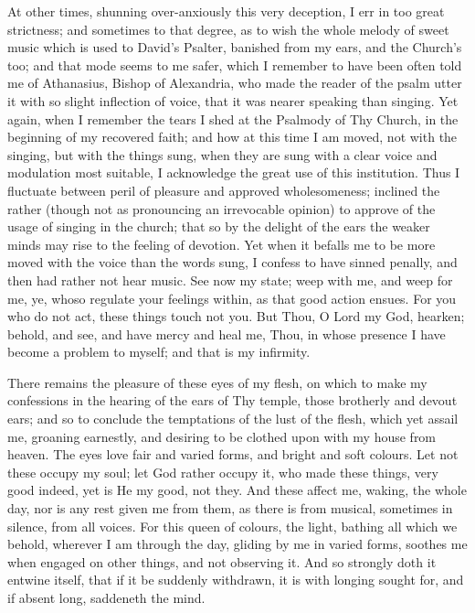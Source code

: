 \documentclass[b5paper,openright,12pt,twoside]{book}
\begin{document}
At other times, shunning over-anxiously this very deception, I err in
too great strictness; and sometimes to that degree, as to wish the whole
melody of sweet music which is used to David's Psalter, banished from
my ears, and the Church's too; and that mode seems to me safer, which I
remember to have been often told me of Athanasius, Bishop of Alexandria,
who made the reader of the psalm utter it with so slight inflection
of voice, that it was nearer speaking than singing. Yet again, when
I remember the tears I shed at the Psalmody of Thy Church, in the
beginning of my recovered faith; and how at this time I am moved, not
with the singing, but with the things sung, when they are sung with a
clear voice and modulation most suitable, I acknowledge the great use
of this institution. Thus I fluctuate between peril of pleasure and
approved wholesomeness; inclined the rather (though not as pronouncing
an irrevocable opinion) to approve of the usage of singing in the
church; that so by the delight of the ears the weaker minds may rise to
the feeling of devotion. Yet when it befalls me to be more moved with
the voice than the words sung, I confess to have sinned penally, and
then had rather not hear music. See now my state; weep with me, and weep
for me, ye, whoso regulate your feelings within, as that good action
ensues. For you who do not act, these things touch not you. But Thou, O
Lord my God, hearken; behold, and see, and have mercy and heal me, Thou,
in whose presence I have become a problem to myself; and that is my
infirmity.

There remains the pleasure of these eyes of my flesh, on which to make
my confessions in the hearing of the ears of Thy temple, those brotherly
and devout ears; and so to conclude the temptations of the lust of
the flesh, which yet assail me, groaning earnestly, and desiring to be
clothed upon with my house from heaven. The eyes love fair and varied
forms, and bright and soft colours. Let not these occupy my soul; let
God rather occupy it, who made these things, very good indeed, yet is
He my good, not they. And these affect me, waking, the whole day, nor
is any rest given me from them, as there is from musical, sometimes in
silence, from all voices. For this queen of colours, the light, bathing
all which we behold, wherever I am through the day, gliding by me in
varied forms, soothes me when engaged on other things, and not observing
it. And so strongly doth it entwine itself, that if it be suddenly
withdrawn, it is with longing sought for, and if absent long, saddeneth
the mind.
\end{document}
